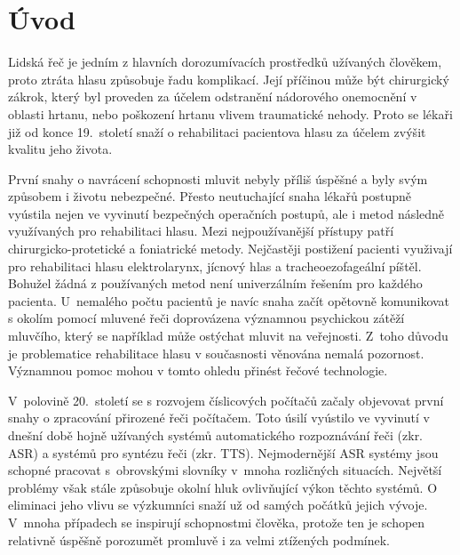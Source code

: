 \chapter*{Úvod}
\label{chap:introduction}

Lidská řeč je jedním z hlavních dorozumívacích prostředků užívaných člověkem, proto
ztráta hlasu způsobuje řadu komplikací. Její příčinou může být chirurgický zákrok, který byl proveden za účelem odstranění nádorového onemocnění v oblasti hrtanu, nebo
poškození hrtanu vlivem traumatické nehody. Proto se lékaři již od konce 19.~století snaží o rehabilitaci pacientova hlasu za účelem zvýšit kvalitu jeho života. 

První snahy o navrácení schopnosti mluvit nebyly příliš úspěšné a byly svým
způsobem i životu nebezpečné. Přesto neutuchající snaha lékařů postupně
vyústila nejen ve vyvinutí bezpečných operačních postupů, ale i metod následně využívaných pro rehabilitaci hlasu. Mezi nejpoužívanější přístupy patří chirurgicko-protetické a foniatrické metody.
Nejčastěji postižení pacienti využivají pro rehabilitaci hlasu elektrolarynx, jícnový hlas a tracheoezofageální píštěl. Bohužel žádná z používaných metod není univerzálním řešením pro každého pacienta.
U~nemalého počtu pacientů je navíc snaha začít opětovně komunikovat s okolím pomocí mluvené řeči doprovázena významnou psychickou zátěží mluvčího, který se například může ostýchat mluvit na veřejnosti. 
Z~toho důvodu je problematice rehabilitace hlasu v současnosti věnována nemalá pozornost. Významnou pomoc mohou v tomto ohledu přinést řečové technologie.

V~polovině 20.~století se s rozvojem číslicových počítačů začaly objevovat první
snahy o zpracování přirozené řeči počítačem. Toto úsilí vyústilo ve vyvinutí v dnešní
době hojně užívaných systémů automatického rozpoznávání řeči (zkr. ASR) a systémů pro syntézu
řeči (zkr. TTS). Nejmodernější ASR systémy jsou schopné pracovat s~obrovskými
slovníky v~mnoha rozličných situacích. Největší problémy však stále způsobuje
okolní hluk ovlivňující výkon těchto systémů. O eliminaci jeho vlivu se
výzkumníci snaží už od samých počátků jejich vývoje. V~mnoha případech se
inspirují schopnostmi člověka, protože ten je schopen relativně úspěšně
porozumět promluvě i za velmi ztížených podmínek. 

